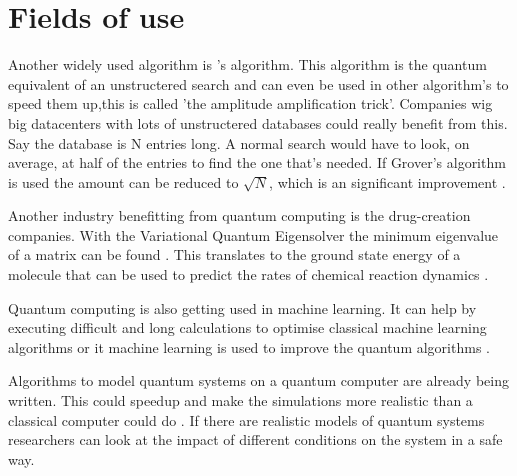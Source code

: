 \section{Fields of use}
\label{sec:Fields of use}
Another widely used algorithm is \textcite{grover}'s algorithm.
This algorithm is the quantum equivalent of an unstructered search and can even be used in other algorithm's to speed them up,this is called 'the amplitude amplification trick'.
Companies wig big datacenters with lots of unstructered databases could really benefit from this. Say the database is N entries long. A normal search would have to look, on average, at half of the entries to find the one that's needed.
If Grover's algorithm is used the amount can be reduced to $\sqrt{N}$, which is an significant improvement \autocite{qiskitgrover}.

Another industry benefitting from quantum computing is the drug-creation companies.
With the Variational Quantum Eigensolver the minimum eigenvalue of a matrix can be found \autocite{simmol}. This translates to the ground state energy of a molecule that can be used to predict the rates of chemical reaction dynamics \autocite{chem}.

Quantum computing is also getting used in machine learning. It can help by executing difficult and long calculations to optimise classical machine learning algorithms or it machine learning is used to improve the quantum algorithms \autocite{qml}.

Algorithms to model quantum systems on a quantum computer are already being written. This could speedup and make the simulations more realistic than a classical computer could do \autocite{simulations}.
If there are realistic models of quantum systems researchers can look at the impact of different conditions on the system in a safe way. 